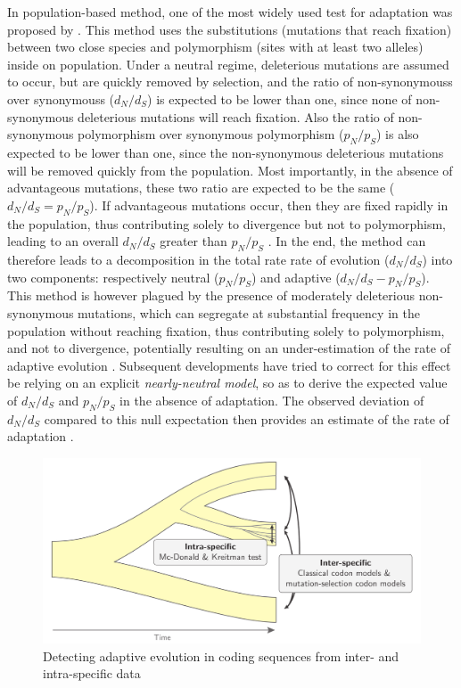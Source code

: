 In population-based method, one of the most widely used test for adaptation was proposed by \citet{McDonald1991}. This method uses the \glspl{substitution} (mutations that reach fixation) between two close species and polymorphism (sites with at least two alleles) inside on population. Under a \gls{neutral} regime, deleterious mutations are assumed to occur, but are quickly removed by selection, and the ratio of \glspl{non-synonymous} over \glspl{synonymous} ($d_N/d_S$) is expected to be lower than one, since none of non-synonymous deleterious mutations will reach fixation. Also the ratio of non-synonymous polymorphism over synonymous polymorphism ($p_N/p_S$) is also expected to be lower than one, since the non-synonymous deleterious mutations will be removed quickly from the population. Most importantly, in the absence of advantageous mutations, these two ratio are expected to be the same ($d_N/d_S=p_N/p_S$). If advantageous mutations occur, then they are fixed rapidly in the population, thus contributing solely to divergence but not to polymorphism, leading to an overall $d_N/d_S$ greater than $p_N/p_S$ \citep{smith_adaptive_2002}. In the end, the method can therefore leads to a decomposition in the total rate rate of evolution ($d_N/d_S$) into two components: respectively \gls{neutral} ($p_N/p_S$) and adaptive ($d_N/d_S-p_N/p_S$). This method is however plagued by the presence of moderately deleterious non-synonymous mutations, which can segregate at substantial frequency in the population without reaching fixation, thus contributing solely to polymorphism, and not to divergence, potentially resulting on an under-estimation of the rate of adaptive evolution \citep{eyre-walker_quantifying_2002}. Subsequent developments have tried to correct for this effect be relying on an explicit \textit{nearly-neutral model}, so as to derive the expected value of $d_N/d_S$ and $p_N/p_S$ in the absence of adaptation. The observed deviation of $d_N/d_S$ compared to this null expectation then provides an estimate of the rate of adaptation \citep{eyre-walker_estimating_2009, Galtier2016}.

\begin{figure}[thbp]
	\centering
	\includegraphics[width=\textwidth] {figures/inter-intra}
	\caption{Detecting adaptive evolution in coding sequences from inter- and intra-specific data}
\end{figure}

